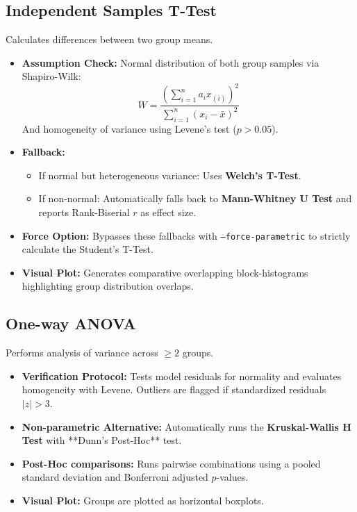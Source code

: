 \documentclass[a4paper,11pt,oneside]{article}
\begin{document}
\subsection{Independent Samples T-Test}
Calculates differences between two group means.
\begin{itemize}
    \item \textbf{Assumption Check:} Normal distribution of both group samples via Shapiro-Wilk:
    \begin{equation}
    W = \frac{\left(\sum_{i=1}^n a_i x_{(i)}\right)^2}{\sum_{i=1}^n (x_i - \bar{x})^2}
    \end{equation}
    And homogeneity of variance using Levene's test ($p > 0.05$).
    \item \textbf{Fallback:}
    \begin{itemize}
        \item If normal but heterogeneous variance: Uses \textbf{Welch's T-Test}.
        \item If non-normal: Automatically falls back to \textbf{Mann-Whitney U Test} and reports Rank-Biserial $r$ as effect size.
    \end{itemize}
    \item \textbf{Force Option:} Bypasses these fallbacks with \texttt{--force-parametric} to strictly calculate the Student's T-Test.
    \item \textbf{Visual Plot:} Generates comparative overlapping block-histograms highlighting group distribution overlaps.
\end{itemize}

\subsection{One-way ANOVA}
Performs analysis of variance across $\geq 2$ groups.
\begin{itemize}
    \item \textbf{Verification Protocol:} Tests model residuals for normality and evaluates homogeneity with Levene. Outliers are flagged if standardized residuals $|z| > 3$.
    \item \textbf{Non-parametric Alternative:} Automatically runs the \textbf{Kruskal-Wallis H Test} with **Dunn's Post-Hoc** test.
    \item \textbf{Post-Hoc comparisons:} Runs pairwise combinations using a pooled standard deviation and Bonferroni adjusted $p$-values.
    \item \textbf{Visual Plot:} Groups are plotted as horizontal boxplots.
\end{itemize}
\end{document}
